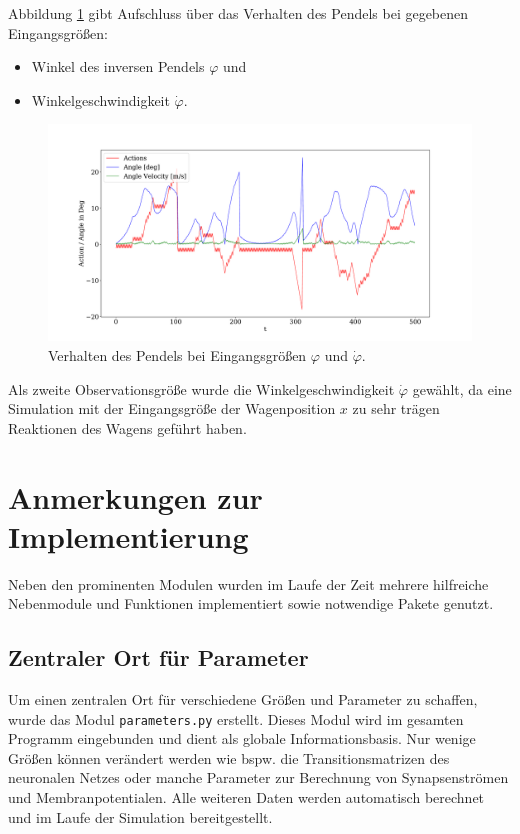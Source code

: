 	Abbildung \ref{fig:plot_action} gibt Aufschluss über das Verhalten des Pendels bei gegebenen Eingangsgrößen:
	\begin{itemize}
		\item Winkel des inversen Pendels $\varphi$ und
		\item Winkelgeschwindigkeit $\dot{\varphi}$.
	\end{itemize}
	\begin{figure}[H]
		\centering
		\includegraphics[width=15cm]{figures/chap_implement/plot_action.pdf}
		\caption{Verhalten des Pendels bei Eingangsgrößen $\varphi$ und $\dot{\varphi}$.}
		\label{fig:plot_action}
	\end{figure}
	Als zweite Observationsgröße wurde die Winkelgeschwindigkeit $\dot{\varphi}$ gewählt, da eine Simulation mit der Eingangsgröße der Wagenposition $x$ zu sehr trägen Reaktionen des Wagens geführt haben.

\section{Anmerkungen zur Implementierung}
\label{sec:imp_sonst}
	Neben den prominenten Modulen wurden im Laufe der Zeit mehrere hilfreiche Nebenmodule und Funktionen implementiert sowie notwendige Pakete genutzt.
	\subsection{Zentraler Ort für Parameter}
		Um einen zentralen Ort für verschiedene Größen und Parameter zu schaffen, wurde das Modul \texttt{parameters.py} erstellt. Dieses Modul wird im gesamten Programm eingebunden und dient als globale Informationsbasis. Nur wenige Größen können verändert werden wie bspw. die Transitionsmatrizen des neuronalen Netzes oder manche Parameter zur Berechnung von Synapsenströmen und Membranpotentialen. Alle weiteren Daten werden automatisch berechnet und im Laufe der Simulation bereitgestellt.
